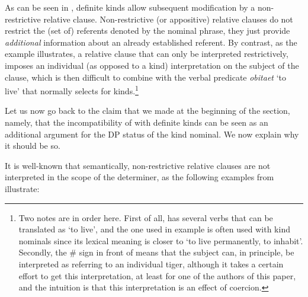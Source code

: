 \documentclass[output=paper
,modfonts
,nonflat]{langsci/langscibook}
\begin{document}
	\ea\label{ex:borik:24}
	\z
	\z
	
	As can be seen in , definite kinds allow subsequent modification by a non-restrictive relative clause. Non-restrictive (or appositive) relative clauses do not restrict the (set of) referents denoted by the nominal phrase, they just provide \textit{additional} information about an already established referent. By contrast, as the example  illustrates, a relative clause that can only be interpreted restrictively, imposes an individual (as opposed to a kind) interpretation on the subject of the clause, which is then difficult to combine with the verbal predicate \textit{obitaet} `to live' that normally selects for kinds.\footnote{Two notes are in order here. First of all,  has several verbs that can be translated as `to live', and the one used in example  is often used with kind nominals since its lexical meaning is closer to `to live permanently, to inhabit'. Secondly, the \# sign in front of  means that the subject can, in principle, be interpreted as referring to an individual tiger, although it takes a certain effort to get this interpretation, at least for one of the authors of this paper, and the intuition is that this interpretation is an effect of coercion.}
	
	Let us now go back to the claim that we made at the beginning of the section, namely, that the incompatibility of  with definite kinds can be seen as an additional argument for the DP status of the kind nominal. We now explain why it should be so. 
	
	It is well-known that semantically, non-restrictive relative clauses are not interpreted in the scope of the determiner, as the following examples from  illustrate: 
	
\end{document}
